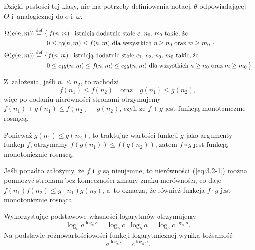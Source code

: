 Dzięki pustości tej klasy, nie ma potrzeby definiowania notacji $\theta$ odpowiadającej $\Theta$ i~analogicznej do $o$ i~$\omega$.

\exercise %
\[
	\begin{split}
		\Omega(g(n,m)) &\stackrel{\text{\scriptsize def}}{=} \bigl\{\,f(n,m):\text{istnieją dodatnie stałe $c$,~$n_0$,~$m_0$ takie, że} \\
		&\qquad 0 \le cg(n,m) \le f(n,m) \text{ dla wszystkich $n \ge n_0$ oraz $m \ge m_0$}\,\bigr\} \\%
		\Theta(g(n,m)) &\stackrel{\text{\scriptsize def}}{=} \bigl\{f(n,m):\text{istnieją dodatnie stałe $c_1$,~$c_2$,~$n_0$,~$m_0$ takie, że} \\
		&\qquad 0 \le c_1g(n,m) \le f(n,m) \le c_2g(n,m) \text{ dla wszystkich $n \ge n_0$ oraz $m \ge m_0$}\,\bigr\}
	\end{split}
\]

\raggedbottom
{}

\exercise %
Z~założenia, jeśli $n_1\le n_2$, to zachodzi
\begin{equation}
	f(n_1) \le f(n_2) \quad\text{oraz}\quad g(n_1) \le g(n_2), \label{eq:3.2-1}
\end{equation}
więc po dodaniu nierówności stronami otrzymujemy $f(n_1)+g(n_1)\le f(n_2)+g(n_2)$, czyli że $f+g$ jest funkcją monotonicznie rosnącą.

Ponieważ $g(n_1)\le g(n_2)$, to traktując wartości funkcji $g$ jako argumenty funkcji $f$, otrzymamy $f(g(n_1))\le f(g(n_2))$, zatem $f\circ g$ jest funkcją monotonicznie rosnącą.

Jeśli ponadto założymy, że $f$ i~$g$ są nieujemne, to nierówności~(\ref{eq:3.2-1}) można pomnożyć stronami bez konieczności zmiany znaku nierówności, co daje $f(n_1)f(n_2)\le g(n_1)g(n_2)$, a~to oznacza, że również funkcja $f\cdot g$ jest monotonicznie rosnąca.

\exercise %
Wykorzystując podstawowe własności logarytmów otrzymujemy
\[
	\log_ba^{\log_bc} = \log_bc\cdot\log_ba = \log_bc^{\log_ba}.
\]
Na podstawie różnowartościowości funkcji logarytmicznej wynika tożsamość
\[
	a^{\log_bc} = c^{\log_ba}.
\]


